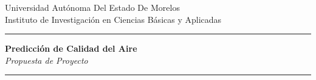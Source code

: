 \documentclass[aspectratio=169]{beamer}
\begin{document}

{
\begin{frame}


  \begin{center}
    {\small{Universidad Autónoma Del Estado De Morelos}}\\[0.05cm]
    {\footnotesize Instituto de Investigación en Ciencias Básicas y Aplicadas}
  \end{center}

\vspace{0.8cm}
  \textcolor{gray}{\rule{\textwidth}{0.4pt}}
  \vspace{-0.4cm}
  
  \begin{center}
    {\Large\bf Predicción de Calidad del Aire}\\[0.2cm]
    {\small\textit{Propuesta de Proyecto}}
  \end{center}

  \vspace{-0.4cm}
  \textcolor{gray}{\rule{\textwidth}{0.4pt}}
  \vspace{0.2cm}




    \vspace{1cm}
  \footnotesize{}

\end{frame}
}
\end{document}
